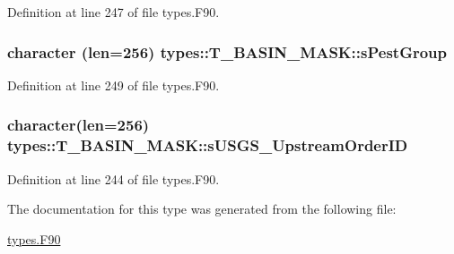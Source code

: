 Definition at line 247 of file types.F90.

\hypertarget{typetypes_1_1_t___b_a_s_i_n___m_a_s_k_ae49a2da9fb28e16c75c6097631ef550d}{
\subsubsection[{sPestGroup}]{\setlength{\rightskip}{0pt plus 5cm}character (len=256) {\bf types::T\_\-BASIN\_\-MASK::sPestGroup}}}
\label{typetypes_1_1_t___b_a_s_i_n___m_a_s_k_ae49a2da9fb28e16c75c6097631ef550d}


Definition at line 249 of file types.F90.

\hypertarget{typetypes_1_1_t___b_a_s_i_n___m_a_s_k_a78f33392b7c282786247688a9060f0d8}{
\subsubsection[{sUSGS\_\-UpstreamOrderID}]{\setlength{\rightskip}{0pt plus 5cm}character(len=256) {\bf types::T\_\-BASIN\_\-MASK::sUSGS\_\-UpstreamOrderID}}}
\label{typetypes_1_1_t___b_a_s_i_n___m_a_s_k_a78f33392b7c282786247688a9060f0d8}


Definition at line 244 of file types.F90.



The documentation for this type was generated from the following file:\begin{DoxyCompactItemize}
\item 
\hyperlink{types_8_f90}{types.F90}\end{DoxyCompactItemize}
